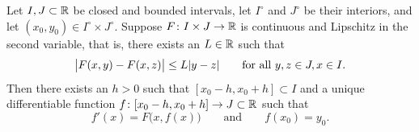 \begin{samepage}
\begin{thm}%
Let $I, J \subset {\mathbb{R}}$ be closed and bounded intervals,
let $I^\circ$ and $J^\circ$ be their interiors, and 
let $(x_0,y_0) \in I^\circ \times J^\circ$.
Suppose $F \colon I \times J \to {\mathbb{R}}$ is continuous
and Lipschitz in the second variable, that is, there exists
an $L \in {\mathbb{R}}$ such that
\begin{equation*}
\bigl\lvert {F(x,y) - F(x,z)} \bigr\rvert \leq L \lvert {y-z} \rvert
\qquad \text{for all } y,z \in J, x \in I .
\end{equation*}
Then there exists an $h > 0$ such that $[x_0-h,x_0+h] \subset I$ and a unique differentiable
function $f \colon [x_0 - h, x_0 + h] \to J \subset {\mathbb{R}}$ such that
\begin{equation*}
f'(x) = F\bigl(x,f(x)\bigr) \qquad \text{and} \qquad f(x_0) = y_0.
\end{equation*}
\end{thm}
\end{samepage}

